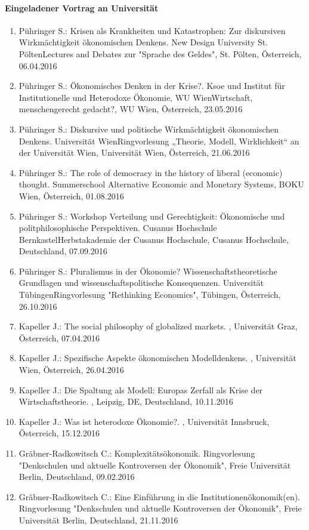 \paragraph{Eingeladener Vortrag an Universität}
\begin{enumerate}
	\item Pühringer S.: Krisen als Krankheiten und Katastrophen: Zur diskursiven Wirkmächtigkeit ökonomischen Denkens. New Design University St. PöltenLectures and Debates zur "Sprache des Geldes", St. Pölten, Österreich, 06.04.2016
	\item Pühringer S.: Ökonomisches Denken in der Krise?. Ksoe und Institut für Institutionelle und Heterodoxe Ökonomie, WU WienWirtschaft, menschengerecht gedacht?, WU Wien, Österreich, 23.05.2016
	\item Pühringer S.: Diskursive und politische Wirkmächtigkeit ökonomischen Denkens. Universität WienRingvorlesung „Theorie, Modell, Wirklichkeit“ an der Universität Wien, Universität Wien, Österreich, 21.06.2016
	\item Pühringer S.: The role of democracy in the history of liberal (economic) thought. Summerschool Alternative Economic and Monetary Systems, BOKU Wien, Österreich, 01.08.2016
	\item Pühringer S.: Workshop Verteilung und Gerechtigkeit: Ökonomische und politphilosophische Perspektiven. Cusanus Hochschule BernkastelHerbstakademie der Cusanus Hochschule, Cusanus Hochschule, Deutschland, 07.09.2016
	\item Pühringer S.: Pluralismus in der Ökonomie? Wissenschaftstheoretische Grundlagen und wissenschaftspolitische Konsequenzen. Universität TübingenRingvorlesung "Rethinking Economics", Tübingen, Österreich, 26.10.2016
	\item Kapeller J.: The social philosophy of globalized markets. , Universität Graz, Österreich, 07.04.2016
	\item Kapeller J.: Spezifische Aspekte ökonomischen Modelldenkens. , Universität Wien, Österreich, 26.04.2016
	\item Kapeller J.: Die Spaltung als Modell: Europas Zerfall als Krise der Wirtschaftstheorie. , Leipzig, DE, Deutschland, 10.11.2016
	\item Kapeller J.: Was ist heterodoxe Ökonomie?. , Universität Innsbruck, Österreich, 15.12.2016
	\item Gräbner-Radkowitsch C.: Komplexitätsökonomik. Ringvorlesung "Denkschulen und aktuelle Kontroversen der Ökonomik", Freie Universität Berlin, Deutschland, 09.02.2016
	\item Gräbner-Radkowitsch C.: Eine Einführung in die Institutionenökonomik(en). Ringvorlesung "Denkschulen und aktuelle Kontroversen der Ökonomik", Freie Universität Berlin, Deutschland, 21.11.2016

\end{enumerate}

